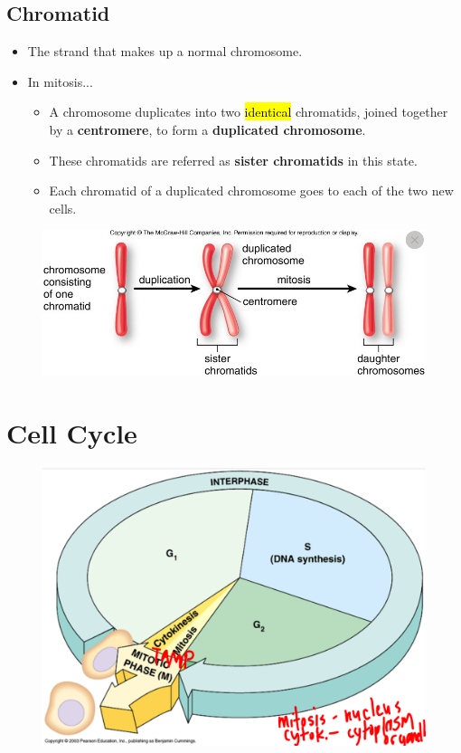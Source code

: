 \documentclass[a4paper,12pt]{article}
\begin{document}
\subsection{Chromatid}
\begin{itemize}
    \item{The strand that makes up a normal chromosome.}
    \item{
            In mitosis...
            \begin{itemize}
                \item{A chromosome duplicates into two \hl{identical} chromatids, joined together by a \textbf{centromere}, to form a \textbf{duplicated chromosome}.}
                \item{These chromatids are referred as \textbf{sister chromatids} in this state.}
                \item{Each chromatid of a duplicated chromosome goes to each of the two new cells.}
            \end{itemize}
        }
\end{itemize}

\begin{figure}[H] \includegraphics[width=\textwidth]{chromosome} \end{figure}

\section{Cell Cycle}
\begin{figure}[H] \includegraphics[width=\textwidth]{cellcycle} \end{figure}
\end{document}
